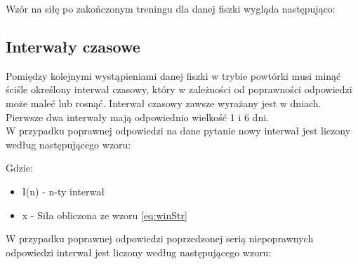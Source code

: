 Wzór na siłę po zakończonym treningu dla danej fiszki wygląda następująco:\\


\subsection{Interwały czasowe}

Pomiędzy kolejnymi wystąpieniami danej fiszki w trybie powtórki musi minąć ściśle określony interwał czasowy, który w zależności od poprawności odpowiedzi może maleć lub rosnąć. 
Interwał czasowy zawsze wyrażany jest w dniach. Pierwsze dwa interwały mają odpowiednio wielkość 1 i 6 dni.
\\
W przypadku poprawnej odpowiedzi na dane pytanie nowy interwał jest liczony według następującego wzoru:



Gdzie:
\begin{itemize}
	\item I(n) - n-ty interwał
	\item x - Siła obliczona ze wzoru \ref{eq:winStr}
\end{itemize}

W przypadku poprawnej odpowiedzi poprzedzonej serią niepoprawnych odpowiedzi interwał jest liczony według następującego wzoru:



